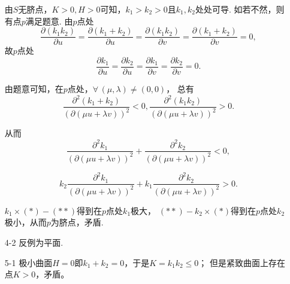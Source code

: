 \begin{itemize}
由$S$无脐点，$K>0,H>0$可知，$k_1>k_2>0$且$k_1,k_2$处处可导.
如若不然，则有点$p$满足题意.
由$p$点处$$\frac{\partial(k_1k_2)}{\partial u}
=\frac{\partial(k_1+k_2)}{\partial u}
=\frac{\partial(k_1k_2)}{\partial v}
=\frac{\partial (k_1+k_2)}{\partial v}=0,$$
故$p$点处$$\frac{\partial k_1}{\partial u}
=\frac{\partial k_2}{\partial u}
=\frac{\partial k_1}{\partial v}
=\frac{\partial k_2}{\partial v}=0.$$

由题意可知，在$p$点处，$\forall\,(\mu,\lambda)\ne(0,0)$，
总有$$\frac{\partial^2(k_1+k_2)}{(\partial(\mu u+\lambda v))^2}<0,
\frac{\partial^2(k_1k_2)}{(\partial(\mu u+\lambda v))^2}>0.$$

从而$$\frac{\partial^2k_1}{(\partial(\mu u+\lambda v))^2}
+\frac{\partial^2k_2}{(\partial(\mu u+\lambda v))^2}<0,\tag*{$(*)$}$$

$$k_2\frac{\partial^2k_1}{(\partial(\mu u+\lambda v))^2}
+k_1\frac{\partial^2k_2}{(\partial(\mu u+\lambda v))^2}>0.\tag*{$(**)$}$$

$k_1\times(*)-(**)$得到在$p$点处$k_1$极大，
$(**)-k_2\times(*)$得到在$p$点处$k_2$极小，从而$p$为脐点，矛盾.

\item[4-2] 反例为平面.

\item[5-1] 极小曲面$H=0$即$k_1+k_2=0$，于是$K=k_1k_2\le0$；
但是紧致曲面上存在点$K>0$，矛盾。
\end{itemize}